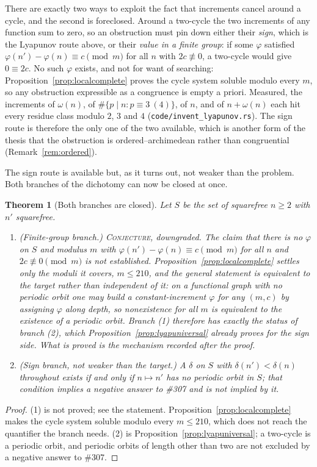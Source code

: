 \documentclass[11pt]{article}
\newtheorem{theorem}{Theorem}[section]
\theoremstyle{definition}
\begin{document}
There are exactly two ways to exploit the fact that increments cancel around a cycle, and the
second is foreclosed. Around a two-cycle the two increments of any function sum to zero, so an
obstruction must pin down either their \emph{sign}, which is the Lyapunov route above, or their
\emph{value in a finite group}: if some $\varphi$ satisfied
$\varphi(n')-\varphi(n)\equiv c\pmod m$ for all $n$ with $2c\not\equiv0$, a two-cycle would give
$0\equiv2c$. No such $\varphi$ exists, and not for want of searching:
Proposition~\ref{prop:localcomplete} proves the cycle system soluble modulo every $m$, so any
obstruction expressible as a congruence is empty a priori. Measured, the increments of
$\omega(n)$, of $\#\{p\mid n:p\equiv3\ (4)\}$, of $n$, and of $n+\omega(n)$ each hit every residue
class modulo $2$, $3$ and $4$ \textup{(\texttt{code/invent\_lyapunov.rs})}. The sign route is
therefore the only one of the two available, which is another form of the thesis that the
obstruction is ordered--archimedean rather than congruential (Remark~\ref{rem:ordered}).

The sign route is available but, as it turns out, not weaker than the problem. Both branches of the
dichotomy can now be closed at once.

\begin{theorem}[Both branches are closed]\label{thm:noinvariant}
Let $S$ be the set of squarefree $n\ge2$ with $n'$ squarefree.
\begin{enumerate}[label=\textup{(\arabic*)},leftmargin=2.2em]
\item \textup{(Finite-group branch.)} \textsc{Conjecture}, downgraded. The claim that there is no
$\varphi$ on $S$ and modulus $m$ with $\varphi(n')-\varphi(n)\equiv c\pmod m$ for all $n$ and
$2c\not\equiv0\pmod m$ is \emph{not} established. Proposition~\ref{prop:localcomplete} settles only
the moduli it covers, $m\le210$, and the general statement is equivalent to the target rather than
independent of it: on a functional graph with no periodic orbit one may build a constant-increment
$\varphi$ for any $(m,c)$ by assigning $\varphi$ along depth, so nonexistence for all $m$ is
equivalent to the existence of a periodic orbit. Branch (1) therefore has exactly the status of
branch (2), which Proposition~\ref{prop:lyapuniversal} already proves for the sign side. What is
proved is the mechanism recorded after the proof.
\item \textup{(Sign branch, not weaker than the target.)} A $\delta$ on $S$ with
$\delta(n')<\delta(n)$ throughout exists if and only if $n\mapsto n'$ has no periodic orbit in $S$;
that condition implies a negative answer to \#307 and is not implied by it.
\end{enumerate}
\end{theorem}
\begin{proof}
(1) is not proved; see the statement. Proposition~\ref{prop:localcomplete} makes the cycle system
soluble modulo every $m\le210$, which does not reach the quantifier the branch needs.
(2) is Proposition~\ref{prop:lyapuniversal}; a two-cycle is a periodic orbit, and periodic orbits of
length other than two are not excluded by a negative answer to \#307.
\end{proof}
\end{document}
